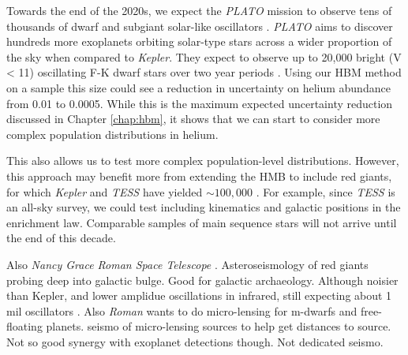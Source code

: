 Towards the end of the 2020s, we expect the \emph{PLATO} mission to observe tens of thousands of dwarf and subgiant solar-like oscillators \citep{Rauer.Catala.ea2014}. \emph{PLATO} aims to discover hundreds more exoplanets orbiting solar-type stars across a wider proportion of the sky when compared to \emph{Kepler}. They expect to observe up to 20,000 bright (V < 11) oscillating F-K dwarf stars over two year periods \citep{Goupil2017}. Using our HBM method on a sample this size could see a reduction in uncertainty on helium abundance from 0.01 to 0.0005. While this is the maximum expected uncertainty reduction discussed in Chapter \ref{chap:hbm}, it shows that we can start to consider more complex population distributions in helium.

This also allows us to test more complex population-level distributions.  However, this approach may benefit more from extending the HMB to include red giants, for which \emph{Kepler} and \emph{TESS} have yielded \(\sim 100,000\) \citep{Hon.Huber.ea2021,Yu.Huber.ea2018}. For example, since \emph{TESS} is an all-sky survey, we could test including kinematics and galactic positions in the enrichment law. Comparable samples of main sequence stars will not arrive until the end of this decade.



Also \emph{Nancy Grace Roman Space Telescope} \citep[\emph{Roman}, formerly \emph{WFIRST};][]{Spergel.Gehrels.ea2015}. Asteroseismology of red giants probing deep into galactic bulge. Good for galactic archaeology. Although noisier than Kepler, and lower amplidue oscillations in infrared, still expecting about 1 mil oscillators \citep{Gould.Huber.ea2015}. Also \emph{Roman} wants to do micro-lensing for m-dwarfs and free-floating planets. seismo of micro-lensing sources to help get distances to source. Not so good synergy with exoplanet detections though. Not dedicated seismo.

